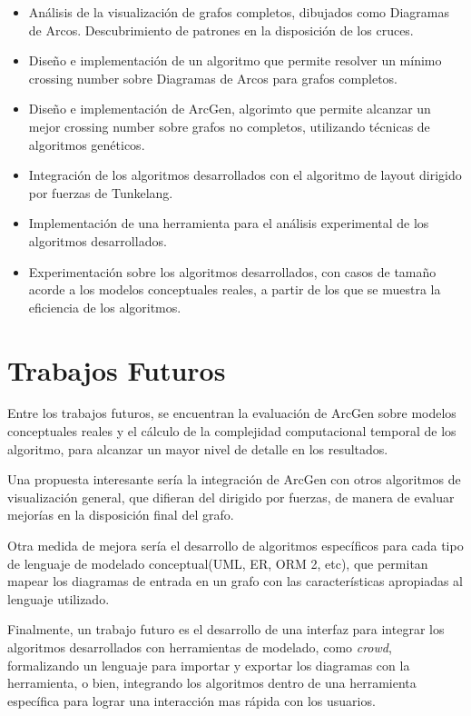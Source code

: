 \begin{itemize}
\item Análisis de la visualización de grafos completos, dibujados como Diagramas de Arcos.  Descubrimiento de  patrones en la disposición de los cruces.
\item Diseño e implementación de un algoritmo que permite resolver un mínimo crossing number sobre Diagramas de Arcos para grafos completos.
\item Diseño e implementación de {\sc ArcGen}, algorimto que permite alcanzar un mejor crossing number sobre  grafos no completos, utilizando técnicas de algoritmos genéticos.

\item Integración de los algoritmos desarrollados con el  algoritmo de layout  dirigido por fuerzas de Tunkelang.

\item Implementación de una herramienta para el  análisis experimental de los algoritmos desarrollados.

\item Experimentación sobre los algoritmos desarrollados, con casos de tamaño acorde a los modelos conceptuales  reales, a partir de los que se muestra  la eficiencia de los  algoritmos.%

\end{itemize}

 \section{Trabajos Futuros}

Entre los trabajos futuros,  se encuentran la evaluación de  {\sc ArcGen} sobre modelos conceptuales reales y el cálculo de la complejidad computacional temporal de los algoritmo, para alcanzar un mayor nivel de detalle en los resultados.

Una propuesta interesante sería la integración de {\sc ArcGen} con otros algoritmos de visualización general, que difieran del dirigido por fuerzas, de manera de   evaluar mejorías en la disposición final del grafo. 

Otra medida de mejora sería  el desarrollo de algoritmos específicos para cada tipo de lenguaje de modelado conceptual(UML, ER, ORM 2, etc), que permitan mapear los diagramas de entrada en un grafo con las características apropiadas al lenguaje  utilizado. 

Finalmente, un trabajo futuro  es el desarrollo de una interfaz para integrar los algoritmos  desarrollados con herramientas de modelado, como \emph{crowd}, formalizando un lenguaje para importar y exportar los diagramas con la herramienta, o bien, integrando los algoritmos dentro de una herramienta específica para lograr una interacción mas rápida con los usuarios. %


